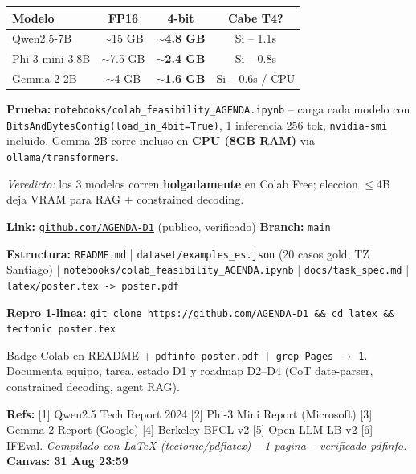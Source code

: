 \documentclass[a4paper,10pt]{article}
\begin{document}
\begin{multicols}{2}
\begin{tcolorbox}
\begin{center}
\renewcommand{\arraystretch}{1.15}
\begin{tabular}{lccc}
\toprule
\textbf{Modelo} & \textbf{FP16} & \textbf{4-bit} & \textbf{Cabe T4?} \\
\midrule
Qwen2.5-7B & $\sim$15 GB & \textbf{$\sim$4.8 GB} & \colorbox{okGreen!20}{Si -- 1.1s} \\
Phi-3-mini 3.8B & $\sim$7.5 GB & \textbf{$\sim$2.4 GB} & \colorbox{okGreen!20}{Si -- 0.8s} \\
Gemma-2-2B & $\sim$4 GB & \textbf{$\sim$1.6 GB} & \colorbox{okGreen!20}{Si -- 0.6s / CPU} \\
\bottomrule
\end{tabular}
\end{center}
\textbf{Prueba:} \texttt{notebooks/colab\_feasibility\_AGENDA.ipynb} -- carga cada modelo con \texttt{BitsAndBytesConfig(load\_in\_4bit=True)}, 1 inferencia 256 tok, \texttt{nvidia-smi} incluido. Gemma-2B corre incluso en \textbf{CPU (8GB RAM)} via \texttt{ollama/transformers}.

\textit{Veredicto:} los 3 modelos corren \textbf{holgadamente} en Colab Free; eleccion $\leq$4B deja VRAM para RAG + constrained decoding.
\end{tcolorbox}

\begin{tcolorbox}[colback=white,colframe=agendaBlue,arc=2pt,boxrule=0.7pt,title={\bfseries\small 5. Repository \quad {\normalfont\scriptsize(10 pts)}},fonttitle=\color{white},colbacktitle=agendaBlue,left=3pt,right=3pt,top=2pt,bottom=3pt]
\scriptsize
\textbf{Link:} \href{https://github.com/AGENDA-D1}{\texttt{github.com/AGENDA-D1}} \quad (publico, verificado) \quad \textbf{Branch:} \texttt{main}

\textbf{Estructura:} \texttt{README.md} | \texttt{dataset/examples\_es.json} (20 casos gold, TZ Santiago) | \texttt{notebooks/colab\_feasibility\_AGENDA.ipynb} | \texttt{docs/task\_spec.md} | \texttt{latex/poster.tex -> poster.pdf}

\textbf{Repro 1-linea:} \texttt{git clone https://github.com/AGENDA-D1 \&\& cd latex \&\& tectonic poster.tex}

Badge Colab en README + \texttt{pdfinfo poster.pdf | grep Pages} $\rightarrow$ \texttt{1}. Documenta equipo, tarea, estado D1 y roadmap D2--D4 (CoT date-parser, constrained decoding, agent RAG).
\end{tcolorbox}

\end{multicols}
\vspace{2pt}
\begin{tcolorbox}[colback=black!5,colframe=black!15,arc=2pt,boxrule=0.4pt,left=3pt,right=3pt,top=2pt,bottom=2pt]
\scriptsize
\textbf{Refs:} [1] Qwen2.5 Tech Report 2024 [2] Phi-3 Mini Report (Microsoft) [3] Gemma-2 Report (Google) [4] Berkeley BFCL v2 [5] Open LLM LB v2 [6] IFEval. \hfill
\textit{Compilado con LaTeX (tectonic/pdflatex) -- 1 pagina -- verificado pdfinfo.} \hfill \textbf{Canvas: 31 Aug 23:59}
\end{tcolorbox}
\end{document}
